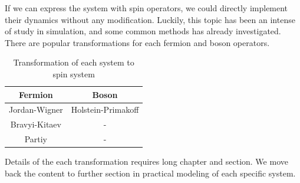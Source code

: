 If we can express the system with spin operators, 
we could directly implement their dynamics
without any modification. 
Luckily, this topic has been an intense of study 
in simulation, and some common methods has already investigated.
There are popular transformations for each fermion and boson operators.

\begin{table}[!ht]
    \centering
    \caption{Transformation of each system to spin system}
    \begin{tabular}{c|c}
        \hline
        Fermion                             & Boson\\
        \hline
        \hline
        Jordan-Wigner                       & Holstein-Primakoff\\
        Bravyi-Kitaev{\cite{BRAVYI2002210}} & - \\
        Partiy                              & -\\
        \hline
    \end{tabular}
\end{table}

Details of the each transformation requires 
long chapter and section. 
We move back the content to further section in practical 
modeling of each specific system.